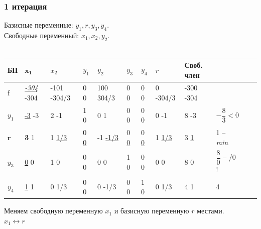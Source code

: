 \documentclass[14pt,a4paper,fleqn]{extarticle}
\begin{document}
\subsubsection*{1 итерация}
Базисные переменные: $y_1, r, y_3, y_4$.\\
Свободные переменный: $x_1, x_2, y_2$.\\\\
\begin{tabularx}{\textwidth}{|p{1cm}V{6}p{1.5cm}V{6}p{1.6cm}|p{0.5cm}|p{1.5cm}|p{0.5cm}|p{0.5cm}|p{1.2cm}|p{1.5cm}|c}
	\hline
	БП & $\boldsymbol{x_1}$ & $x_2$ & $y_1$ & $y_2$ & $y_3$ & $y_4$ & $r$ & Своб. член & \\
	\hline
	
	f & \small \underline{\textit{-304}} \scriptsize -304 & \small -101 \tiny -304/3 & 0 \scriptsize 0 & \small 100  \scriptsize 304/3 & 0 \scriptsize 0 & 0 \scriptsize 0 & 0 \tiny -304/3 & \small -300 \tiny -304 & \\
	
	\hline
	
	$y_1$ & \underline{-3} \scriptsize -3 & 2 \scriptsize -1 & 1 \scriptsize 0 & 0 \scriptsize 1 & 0 \scriptsize 0 & 0 \scriptsize 0 & 0 \scriptsize -1 & 8 \scriptsize -3 & $-\dfrac{8}{3} < 0$ \\
	
	\Xhline{6\arrayrulewidth}
	
	$\boldsymbol{r}$ & \textbf{3} \scriptsize 1 & 1 \underline{\scriptsize 1/3} & 0 \underline{\scriptsize 0} & -1 \underline{\tiny -1/3} & 0 \underline{\scriptsize 0} & 0  \underline{\scriptsize 0} & 1 \underline{\scriptsize 1/3} & 3 \underline{\scriptsize 1} & 1 -- \textit{min} \\
	
	\Xhline{6\arrayrulewidth}
	$y_3$ & \underline{0} \scriptsize 0 & 1 \scriptsize 0 & 0 \scriptsize 0 & 0 \scriptsize 0 & 1 \scriptsize 0 & 0 \scriptsize 0 & 0 \scriptsize 0 & 8 \scriptsize 0 & $\dfrac{8}{0}$ -- /0 ! \\
	\hline
	$y_4$ & \underline{1} \scriptsize 1 & 0 \scriptsize 1/3 & 0 \scriptsize 0 & 0 \scriptsize -1/3 & 0 \scriptsize 0 & 1 \scriptsize 0 & 0 \scriptsize 1/3 & 4 \scriptsize 1 & 4 \\
	\hline
\end{tabularx}
\newline\newline
Меняем свободную переменную $x_1$ и базисную переменную $r$ местами.\\
$x_1 \leftrightarrow r$
\end{document}
